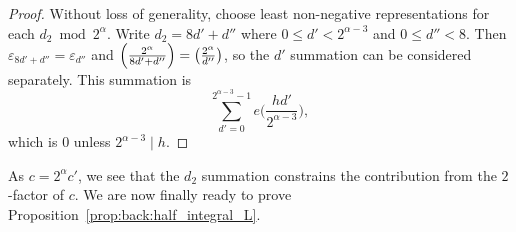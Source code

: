 \begin{proof}
  Without loss of generality, choose least non-negative representations for each $d_2 \bmod
  2^\alpha$.
  Write $d_2 = 8d' + d''$ where $0 \leq d' < 2^{\alpha - 3}$ and $0 \leq d'' < 8$.
  Then $\varepsilon_{8d' + d''} = \varepsilon_{d''}$ and
  $\left(\frac{2^\alpha}{8d' + d''}\right) = \left(\frac{2^\alpha}{d''}\right)$, so the $d'$ summation can be
  considered separately.
  This summation is
  \begin{equation}
    \sum_{d' = 0}^{2^{\alpha-3} - 1} e \bigg( \frac{h d'}{2^{\alpha - 3}} \bigg),
  \end{equation}
  which is $0$ unless $2^{\alpha - 3} \mid h$.
%
\end{proof}


As $c = 2^\alpha c'$, we see that the $d_2$ summation constrains the contribution from the
$2$-factor of $c$.
We are now finally ready to prove Proposition~\ref{prop:back:half_integral_L}.


